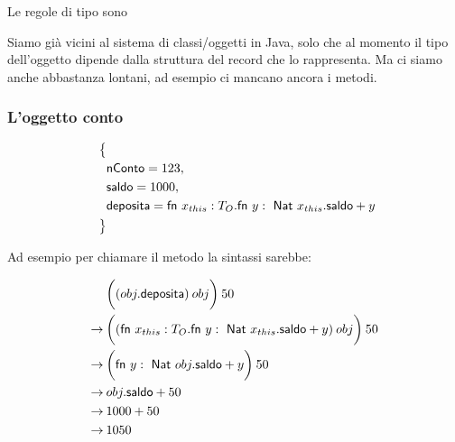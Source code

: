 \begin{prooftree}
\end{prooftree}

\begin{prooftree}
\end{prooftree}

\noindent Le regole di tipo sono

\begin{prooftree}
\end{prooftree}

\begin{prooftree}
\end{prooftree}


\noindent Siamo già vicini al sistema di classi/oggetti in Java, solo che al momento il tipo dell'oggetto dipende dalla struttura del record che lo rappresenta.
Ma ci siamo anche abbastanza lontani, ad esempio ci mancano ancora i metodi.

\subsubsection{L'oggetto conto}

\begin{align*}
\big\{& \\
	\quad & \text{nConto} = 123,  \\
	\quad &\text{saldo} = 1000, \\
	\quad &\text{deposita} = \fn x_{this} : T_O . \fn y : \Nat  x_{this}.\text{saldo} + y  \\
\big\}&
\end{align*}

Ad esempio per chiamare il metodo  la sintassi sarebbe:

\begin{align*}
\quad &\bigg( (obj.\text{deposita}) \: obj \bigg) \: 50  \\
\rightarrow\: & \bigg( (\fn x_{this} : T_O . \fn y : \Nat  x_{this}.\text{saldo} + y )\: obj \bigg)\: 50  \\
\rightarrow\: & \bigg( \fn y : \Nat obj.\text{saldo} + y \bigg)\: 50  \\
\rightarrow\: & obj.\text{saldo} + 50 \\
\rightarrow\: & 1000 + 50 \\
\rightarrow\: & 1050
\end{align*}

